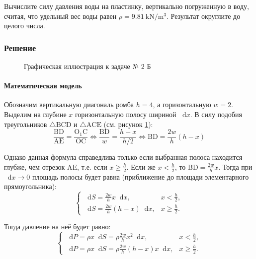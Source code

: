 \documentclass[a4paper,12pt]{article}
\newcommand*\diff{\mathop{}\!\mathrm{d}}
\begin{document}
Вычислите силу давления воды на пластинку, вертикально погруженную в воду,
считая, что удельный вес воды равен \(\rho = \SI{9.81}{\kN\per\cubic\metre}\).
Результат округлите до целого числа.

\subsubsection{Решение}

\begin{figure}[htbp]
  \centering
  \caption{Графическая иллюстрация к задаче № 2 Б}\label{fig:2b}
\end{figure}

\paragraph{Математическая модель}

Обозначим вертикальную диагональ ромба \(h = 4\), а горизонтальную \(w = 2\).
Выделим на глубине \(x\) горизонтальную полосу шириной \(\diff x\).
В силу подобия треугольников
\(\triangle \mathrm{BCD}\) и \(\triangle \mathrm{ACE}\)
(см. рисунок \ref{fig:2b}):
\[
  \frac{\mathrm{BD}}{\mathrm{AE}} = \frac{\mathrm{O_1 C}}{\mathrm{OC}}
  \Leftrightarrow
  \frac{\mathrm{BD}}{w} = \frac{h - x}{h / 2}
  \Leftrightarrow
  \mathrm{BD} = \frac{2w}{h} (h - x)
\]

Однако данная формула справедлива только
если выбранная полоса находится глубже, чем отрезок \(\mathrm{AE}\),
т.е. если \(x \ge \frac{h}{2}\).
Если же \(x < \frac{h}{2}\), то \(\mathrm{BD} = \frac{2w}{h} x\).
Тогда при \(\diff x \to 0\) площадь полосы будет равна
(приближение до площади элементарного прямоугольника):
\begin{equation}
  \begin{cases}
    \diff S = \frac{2w}{h} x \diff x, & x < \frac{h}{2}, \\
    \diff S = \frac{2w}{h} (h - x) \diff x, & x \ge \frac{h}{2}.
  \end{cases}
\end{equation}

Тогда давление на неё будет равно:
\begin{equation}
  \begin{cases}
    \diff P = \rho x \diff S
      = \rho \frac{2w}{h} x^2 \diff x, & x < \frac{h}{2}, \\
    \diff P = \rho x \diff S
      = \rho \frac{2w}{h} (h - x) x \diff x, & x \ge \frac{h}{2}.
  \end{cases}
\end{equation}
\end{document}
